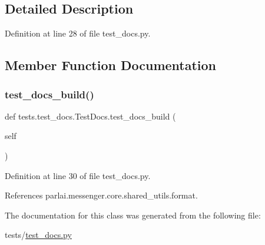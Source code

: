\subsection{Detailed Description}


Definition at line 28 of file test\+\_\+docs.\+py.



\subsection{Member Function Documentation}
\mbox{\label{classtests_1_1test__docs_1_1TestDocs_ad8142c9573a84626d58a8d26cf2ac695}} 
\subsubsection{\texorpdfstring{test\+\_\+docs\+\_\+build()}{test\_docs\_build()}}
{\footnotesize\ttfamily def tests.\+test\+\_\+docs.\+Test\+Docs.\+test\+\_\+docs\+\_\+build (\begin{DoxyParamCaption}\item[{}]{self }\end{DoxyParamCaption})}



Definition at line 30 of file test\+\_\+docs.\+py.



References parlai.\+messenger.\+core.\+shared\+\_\+utils.\+format.



The documentation for this class was generated from the following file\+:\begin{DoxyCompactItemize}
\item 
tests/\hyperlink{test__docs_8py}{test\+\_\+docs.\+py}\end{DoxyCompactItemize}
